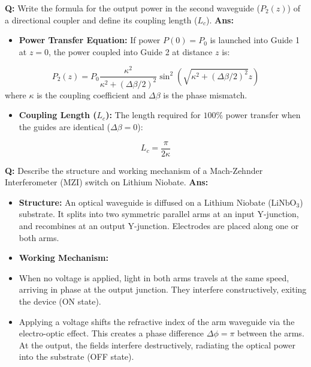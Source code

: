 \documentclass[10pt,a4paper,twocolumn]{article}
\begin{document}
\begin{tcolorbox}[
  colback=white,
  colframe=UnitColorFive,
  colbacktitle=gray!10!white,
  coltitle=black,
  fonttitle=\bfseries\sffamily\small,
  title={Unit V $\bullet$ Card 5: Coupled Mode Analysis Formula},
  boxrule=1.2pt,
  arc=2mm,
  outer arc=2mm,
  boxsep=1.5mm,
  top=1mm,
  bottom=1mm,
  left=1.5mm,
  right=1.5mm,
  before skip=2.5mm,
  after skip=2.5mm
]
\textbf{Q:} Write the formula for the output power in the second waveguide ($P_2(z)$) of a directional coupler and define its coupling length ($L_c$).
\tcbline
\textbf{Ans:} \begin{itemize}
  \item   \textbf{Power Transfer Equation:} If power $P(0) = P_0$ is launched into Guide 1 at $z=0$, the power coupled into Guide 2 at distance $z$ is:
\end{itemize}
        \[ P_2(z) = P_0 \frac{\kappa^2}{\kappa^2 + (\Delta\beta/2)^2} \sin^2\left(\sqrt{\kappa^2 + (\Delta\beta/2)^2} z\right) \]
        where $\kappa$ is the coupling coefficient and $\Delta\beta$ is the phase mismatch.
\begin{itemize}
  \item   \textbf{Coupling Length ($L_c$):} The length required for $100\%$ power transfer when the guides are identical ($\Delta\beta = 0$):
\end{itemize}
        \[ L_c = \frac{\pi}{2\kappa} \]
\end{tcolorbox}


\begin{tcolorbox}[
  colback=white,
  colframe=UnitColorFive,
  colbacktitle=gray!10!white,
  coltitle=black,
  fonttitle=\bfseries\sffamily\small,
  title={Unit V $\bullet$ Card 6: Lithium Niobate ($\text{LiNbO}_3$) electro-optic switches},
  boxrule=1.2pt,
  arc=2mm,
  outer arc=2mm,
  boxsep=1.5mm,
  top=1mm,
  bottom=1mm,
  left=1.5mm,
  right=1.5mm,
  before skip=2.5mm,
  after skip=2.5mm
]
\textbf{Q:} Describe the structure and working mechanism of a Mach-Zehnder Interferometer (MZI) switch on Lithium Niobate.
\tcbline
\textbf{Ans:} \begin{itemize}
  \item   \textbf{Structure:} An optical waveguide is diffused on a Lithium Niobate ($\text{LiNbO}_3$) substrate. It splits into two symmetric parallel arms at an input Y-junction, and recombines at an output Y-junction. Electrodes are placed along one or both arms.
  \item   \textbf{Working Mechanism:}
  \item   When no voltage is applied, light in both arms travels at the same speed, arriving in phase at the output junction. They interfere constructively, exiting the device (ON state).
  \item   Applying a voltage shifts the refractive index of the arm waveguide via the electro-optic effect. This creates a phase difference $\Delta\phi = \pi$ between the arms. At the output, the fields interfere destructively, radiating the optical power into the substrate (OFF state).
\end{itemize}
\end{tcolorbox}
\end{document}
